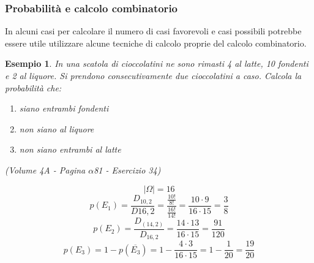 \documentclass{article}     %
\newtheorem{ex}{Esempio}[section]
\begin{document}
        \subsubsection{Probabilità e calcolo combinatorio}
            In alcuni casi per calcolare il numero di casi favorevoli e casi possibili potrebbe essere utile utilizzare alcune tecniche di calcolo proprie del calcolo combinatorio.
            \begin{ex}
                In una scatola di cioccolatini ne sono rimasti 4 al latte, 10 fondenti e 2 al liquore. Si prendono consecutivamente due cioccolatini a caso. Calcola la probabilità che:
                \begin{enumerate}
                    \item siano entrambi fondenti
                    \item non siano al liquore
                    \item non siano entrambi al latte
                \end{enumerate}
                (Volume 4A - Pagina $\alpha$81 - Esercizio 34)
            \end{ex}

            \[|\Omega|=16\]
            \[p(E_1)=\frac{D_{10,2}}{D{16,2}}=\frac{\frac{10!}{8!}}{\frac{16!}{14!}}=\frac{10\cdot9}{16\cdot15}=\frac{3}{8}\]
            \[p(E_2)=\frac{D_(14,2)}{D_{16,2}}=\frac{14\cdot13}{16\cdot15}=\frac{91}{120}\]
            \[p(E_3)=1-p(\overline{E_3})=1-\frac{4\cdot3}{16\cdot15}=1-\frac{1}{20}=\frac{19}{20}\]
\end{document}
